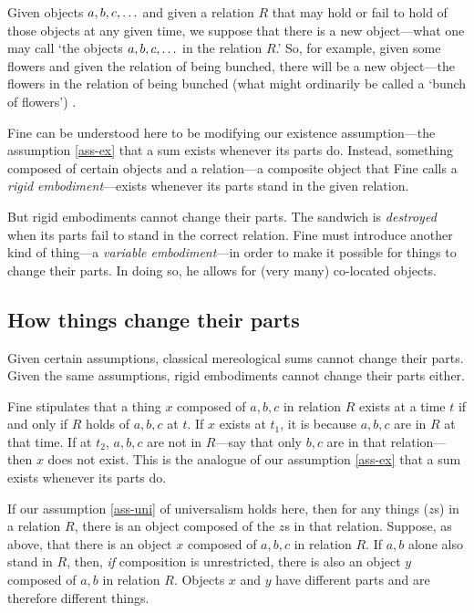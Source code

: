 \documentclass[12pt,twoside]{reedfancy}
\newenvironment{squote}{%
	\begin{spacing}{1}
	\begin{list}{}{%
	\setlength{\labelwidth}{0pt}%
	\rightmargin\leftmargin%
	}
	\item\relax
	}{%
	\end{list}%
	\end{spacing}
	}
\begin{document}
\begin{spacing}{1.25}
\begin{squote}
Given objects $a, b, c, \mathellipsis $ and given a relation $R$ that
may hold or fail to hold of those objects at any given time, we
suppose that there is a new object---what one may call `the objects
$a, b, c, \mathellipsis $ in the relation $R$.'  So, for example,
given some flowers and given the relation of being bunched, there will
be a new object---the flowers in the relation of being bunched (what
might ordinarily be called a `bunch of flowers')
\citeyearpar[65]{fine1999}.
\end{squote}

Fine can be understood here to be modifying our existence
assumption---the assumption \ref{ass-ex} that a sum exists whenever
its parts do.  Instead, something composed of certain objects and a
relation---a composite object that Fine calls a {\em rigid
  embodiment}---exists whenever its parts stand in the given relation.

But rigid embodiments cannot change their parts.  The sandwich is {\em
  destroyed} when its parts fail to stand in the correct relation.
Fine must introduce another kind of thing---a {\em variable
  embodiment}---in order to make it possible for things to change
their parts.  In doing so, he allows for (very many) co-located
objects.

\subsection{How things change their parts}
\label{h-part}
Given certain assumptions, classical mereological sums cannot change
their parts.  Given the same assumptions, rigid embodiments cannot
change their parts either.

Fine stipulates that a thing $x$ composed of $a, b, c$ in relation $R$
exists at a time $t$ if and only if $R$ holds of $a, b, c$ at $t$.  If
$x$ exists at $t_1$, it is because $a, b, c$ are in $R$ at that time.
If at $t_2$, $a, b, c$ are not in $R$---say that only $b, c$ are in
that relation---then $x$ does not exist.  This is the analogue of our
assumption \ref{ass-ex} that a sum exists whenever its parts do.

If our assumption \ref{ass-uni} of universalism holds here, then for
any things ($z$s) in a relation $R$, there is an object composed of
the $z$s in that relation.  Suppose, as above, that there is an object
$x$ composed of $a, b, c$ in relation $R$.  If $a, b$ alone also stand
in $R$, then, {\em if} composition is unrestricted, there is also an
object $y$ composed of $a, b$ in relation $R$.  Objects $x$ and $y$
have different parts and are therefore different things.


\end{spacing}
\end{document}
